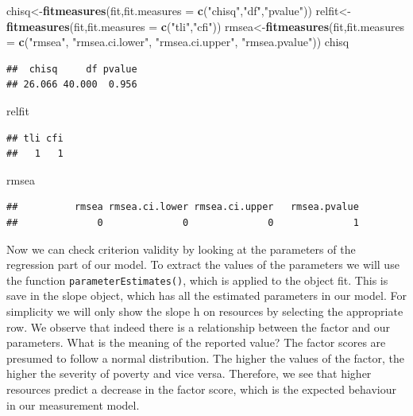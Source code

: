 \documentclass[]{book}
\newenvironment{Shaded}{\begin{snugshade}}{\end{snugshade}}
\newcommand{\DataTypeTok}[1]{\textcolor[rgb]{0.13,0.29,0.53}{#1}}
\newcommand{\KeywordTok}[1]{\textcolor[rgb]{0.13,0.29,0.53}{\textbf{#1}}}
\newcommand{\NormalTok}[1]{#1}
\newcommand{\StringTok}[1]{\textcolor[rgb]{0.31,0.60,0.02}{#1}}
\begin{document}
\begin{Shaded}
\begin{Highlighting}[]
\NormalTok{chisq<-}\KeywordTok{fitmeasures}\NormalTok{(fit,}\DataTypeTok{fit.measures =} \KeywordTok{c}\NormalTok{(}\StringTok{"chisq"}\NormalTok{,}\StringTok{"df"}\NormalTok{,}\StringTok{"pvalue"}\NormalTok{))}
\NormalTok{relfit<-}\KeywordTok{fitmeasures}\NormalTok{(fit,}\DataTypeTok{fit.measures =} \KeywordTok{c}\NormalTok{(}\StringTok{"tli"}\NormalTok{,}\StringTok{"cfi"}\NormalTok{))}
\NormalTok{rmsea<-}\KeywordTok{fitmeasures}\NormalTok{(fit,}\DataTypeTok{fit.measures =} \KeywordTok{c}\NormalTok{(}\StringTok{"rmsea"}\NormalTok{, }\StringTok{"rmsea.ci.lower"}\NormalTok{,}
                                        \StringTok{"rmsea.ci.upper"}\NormalTok{, }\StringTok{"rmsea.pvalue"}\NormalTok{))}
\NormalTok{chisq}
\end{Highlighting}
\end{Shaded}

\begin{verbatim}
##  chisq     df pvalue 
## 26.066 40.000  0.956
\end{verbatim}

\begin{Shaded}
\begin{Highlighting}[]
\NormalTok{relfit}
\end{Highlighting}
\end{Shaded}

\begin{verbatim}
## tli cfi 
##   1   1
\end{verbatim}

\begin{Shaded}
\begin{Highlighting}[]
\NormalTok{rmsea}
\end{Highlighting}
\end{Shaded}

\begin{verbatim}
##          rmsea rmsea.ci.lower rmsea.ci.upper   rmsea.pvalue 
##              0              0              0              1
\end{verbatim}

Now we can check criterion validity by looking at the parameters of the regression part of our model. To extract the values of the parameters we will use the function \texttt{parameterEstimates()}, which is applied to the object fit. This is save in the slope object, which has all the estimated parameters in our model. For simplicity we will only show the slope h on resources by selecting the appropriate row. We observe that indeed there is a relationship between the factor and our parameters. What is the meaning of the reported value? The factor scores are presumed to follow a normal distribution. The higher the values of the factor, the higher the severity of poverty and vice versa. Therefore, we see that higher resources predict a decrease in the factor score, which is the expected behaviour in our measurement model.
\end{document}
